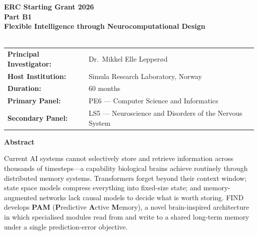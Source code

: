 
\thispagestyle{empty}
\begin{center}
{\Large \textbf{ERC Starting Grant 2026}}\\[4mm]
{\Large \textbf{Part B1}}\\[8mm]

{\LARGE \textbf{Flexible Intelligence through Neurocomputational Design}}\\[4mm]

{\Large \textbf{\project}}\\[8mm]

\begin{tabular}{ll}
\textbf{Principal Investigator:} & Dr.\ Mikkel Elle Lepperød \\[2pt]
\textbf{Host Institution:} & Simula Research Laboratory, Norway \\[2pt]
\textbf{Duration:} & 60 months \\[2pt]
\textbf{Primary Panel:} & PE6 — Computer Science and Informatics \\[2pt]
\textbf{Secondary Panel:} & LS5 — Neuroscience and Disorders of the Nervous System \\[2pt]
\end{tabular}
\end{center}
\vspace{6mm}

\noindent\textbf{Abstract}

\noindent Current AI systems cannot selectively store and retrieve information across thousands of timesteps---a capability biological brains achieve routinely through distributed memory systems. Transformers forget beyond their context window; state space models compress everything into fixed-size state; and memory-augmented networks lack causal models to decide what is worth storing. FIND develops \textbf{PAM} (\textbf{P}redictive \textbf{A}ctive \textbf{M}emory), a novel brain-inspired architecture in which specialised modules read from and write to a shared long-term memory under a single prediction-error objective.

